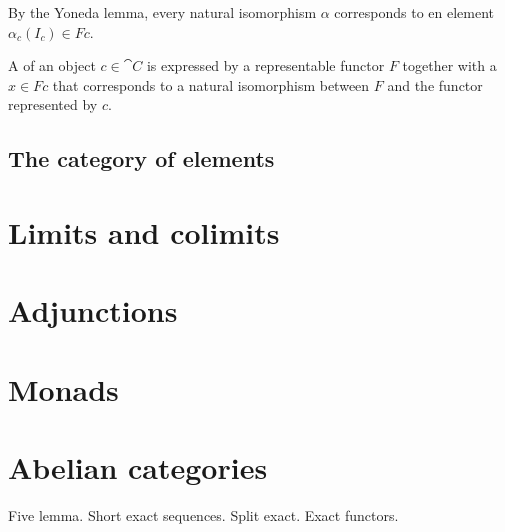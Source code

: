 By the Yoneda lemma, every natural isomorphism $\alpha$ corresponds to en element $\alpha_c(I_c) \in Fc$.
\begin{definition}
A  of an object $c\in \cat{C}$ is expressed by a representable functor $F$ together with a  $x\in Fc$ that corresponds to a natural isomorphism between $F$ and the functor represented by $c$.
\end{definition}
\section{The category of elements}
\chapter{Limits and colimits}
\chapter{Adjunctions}
\chapter{Monads}

\chapter{Abelian categories}
Five lemma. Short exact sequences. Split exact. Exact functors.
